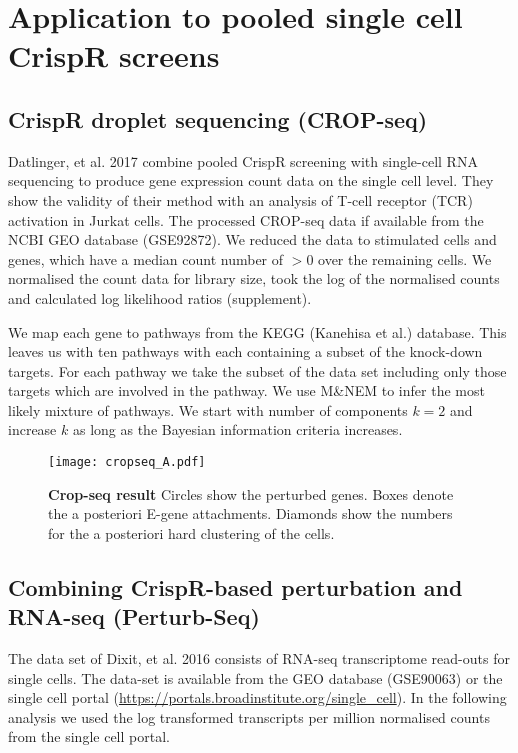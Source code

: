 \documentclass[12pt]{article}
\begin{document}
\section{Application to pooled single cell CrispR screens}

\subsection{CrispR droplet sequencing (CROP-seq)}

Datlinger, et al. 2017 combine pooled CrispR screening with single-cell RNA sequencing to produce gene expression count data on the single cell level. They show the validity of their method with an analysis of T-cell receptor (TCR) activation in Jurkat cells. The processed CROP-seq data if available from the NCBI GEO database (GSE92872). We reduced the data to stimulated cells and genes, which have a median count number of $> 0$ over the remaining cells. We normalised the count data for library size, took the log of the normalised counts and calculated log likelihood ratios (supplement).

We map each gene to pathways from the KEGG (Kanehisa et al.) database. This leaves us with ten pathways with each containing a subset of the knock-down targets. For each pathway we take the subset of the data set including only those targets which are involved in the pathway. We use M\&NEM to infer the most likely mixture of pathways. We start with number of components $k=2$ and increase $k$ as long as the Bayesian information criteria increases. 

\begin{figure}
\texttt{[image: cropseq\_A.pdf]}%
\caption{\textbf{Crop-seq result} Circles show the perturbed genes. Boxes denote the a posteriori E-gene attachments. Diamonds show the numbers for the a posteriori hard clustering of the cells. }\label{fig:cropseq}
\end{figure}

\subsection{Combining CrispR-based perturbation and RNA-seq (Perturb-Seq)}

The data set of Dixit, et al. 2016 consists of RNA-seq transcriptome read-outs for single cells. The data-set is available from the GEO database (GSE90063) or the single cell portal (\url{https://portals.broadinstitute.org/single_cell}). In the following analysis we used the log transformed transcripts per million normalised counts from the single cell portal. 
\end{document}
